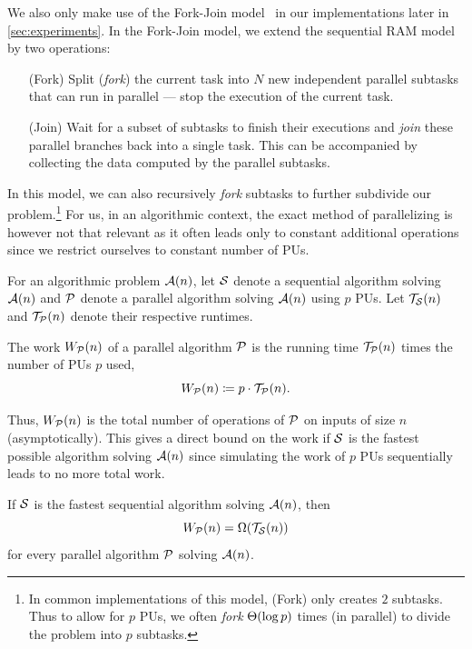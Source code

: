 We also only make use of the Fork-Join model~\cite{ForkJoin} in our implementations later in \cref{sec:experiments}.
In the Fork-Join model, we extend the sequential RAM model by two operations: \begin{itemize}
  \item[(Fork)] 
    Split (\emph{fork}) the current task into $N$ new independent parallel subtasks that can run in parallel --- stop the execution of the current task.
  \item[(Join)] 
    Wait for a subset of subtasks to finish their executions and \emph{join} these parallel branches back into a single task.
    This can be accompanied by collecting the data computed by the parallel subtasks.
\end{itemize}
In this model, we can also recursively \emph{fork} subtasks to further subdivide our problem.\footnote{In common implementations of this model, (Fork) only creates $2$ subtasks. Thus to allow for $p$ PUs, we often \emph{fork} $\Theta\!\left(\log p\right)$ times (in parallel) to divide the problem into $p$ subtasks.}
For us, in an algorithmic context, the exact method of parallelizing is however not that relevant as it often leads only to constant additional operations since we restrict ourselves to constant number of PUs.

\medskip

For an algorithmic problem $\mathcal{A}(n)$, let $\mathcal{S}$ denote a sequential algorithm solving $\mathcal{A}(n)$ and $\mathcal{P}$ denote a parallel algorithm solving $\mathcal{A}(n)$ using $p$ PUs.
Let $\mathcal{T}_{\mathcal{S}}(n)$ and $\mathcal{T}_{\mathcal{P}}(n)$ denote their respective runtimes.

\begin{definition}[Work]
  The work $W_{\mathcal{P}}(n)$ of a parallel algorithm $\mathcal{P}$ is the running time $\mathcal{T}_{\mathcal{P}}(n)$ times the number of PUs $p$ used, \ie \[
    W_{\mathcal{P}}(n) \coloneqq p \cdot \mathcal{T}_{\mathcal{P}}(n).
  \] 
\end{definition}

Thus, $W_{\mathcal{P}}(n)$ is the total number of operations of $\mathcal{P}$ on inputs of size $n$ (asymptotically).
This gives a direct bound on the work if $\mathcal{S}$ is the fastest possible algorithm solving $\mathcal{A}(n)$ since simulating the work of $p$ PUs sequentially leads to no more total work.

\begin{observation}\label{obs:work_bounded}
  If $\mathcal{S}$ is the fastest sequential algorithm solving $\mathcal{A}(n)$, then \[
    W_{\mathcal{P}}(n) = \Omega\!\left(\mathcal{T}_{\mathcal{S}}(n)\right)
  \] for every parallel algorithm $\mathcal{P}$ solving $\mathcal{A}(n)$.
\end{observation}

